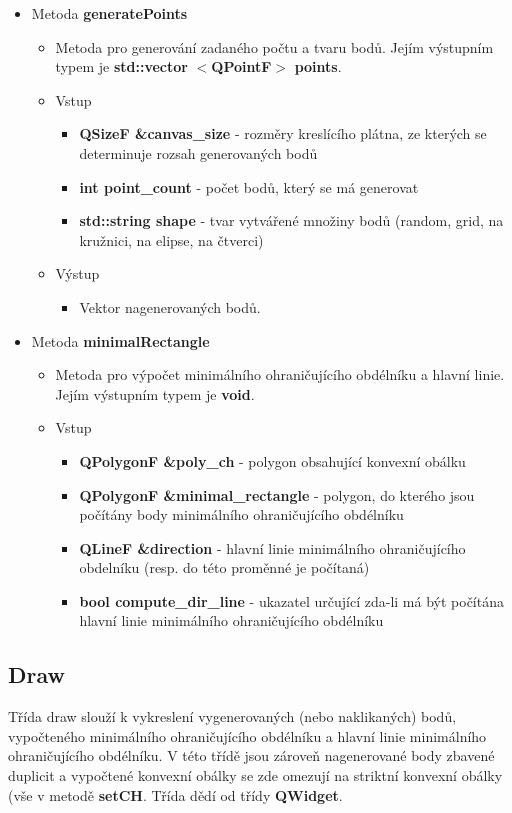 \documentclass[a4paper, 12pt]{article}
\begin{document}
\begin{itemize}
	\item Metoda \textbf{generatePoints}
		\begin{itemize}
			\item Metoda pro generování zadaného počtu a tvaru bodů. Jejím výstupním typem je \textbf{std::vector} $<$\textbf{QPointF}$>$ \textbf{points}.
			\item Vstup
				\begin{itemize}
					\item \textbf{QSizeF \&canvas\_size} - rozměry kreslícího plátna, ze kterých se determinuje rozsah generovaných bodů
					\item \textbf{int point\_count} - počet bodů, který se má generovat
					\item \textbf{std::string shape} - tvar vytvářené množiny bodů (random, grid, na kružnici, na elipse, na čtverci)
				\end{itemize}
			\item Výstup
				\begin{itemize}
					\item Vektor nagenerovaných bodů.
				\end{itemize}
		\end{itemize}

	\item Metoda \textbf{minimalRectangle}
		\begin{itemize}
			\item Metoda pro výpočet minimálního ohraničujícího obdélníku a hlavní linie. Jejím výstupním typem je \textbf{void}.
			\item Vstup
				\begin{itemize}
					\item \textbf{QPolygonF \&poly\_ch} - polygon obsahující konvexní obálku
					\item \textbf{QPolygonF \&minimal\_rectangle} - polygon, do kterého jsou počítány body minimálního ohraničujícího obdélníku
					\item \textbf{QLineF \&direction} - hlavní linie minimálního ohraničujícího obdelníku (resp. do této proměnné je počítaná)
					\item \textbf{bool compute\_dir\_line} - ukazatel určující zda-li má být počítána hlavní linie minimálního ohraničujícího obdélníku
				\end{itemize}

		\end{itemize}
\end{itemize}
\clearpage

\subsection{Draw}
Třída draw slouží k vykreslení vygenerovaných (nebo naklikaných) bodů, vypočteného minimálního ohraničujícího obdélníku a hlavní linie minimálního ohraničujícího obdélníku. V této třídě jsou zároveň nagenerované body zbavené duplicit a vypočtené konvexní obálky se zde omezují na striktní konvexní obálky (vše v metodě \textbf{setCH}. Třída dědí od třídy \textbf{QWidget}. 
\end{document}

